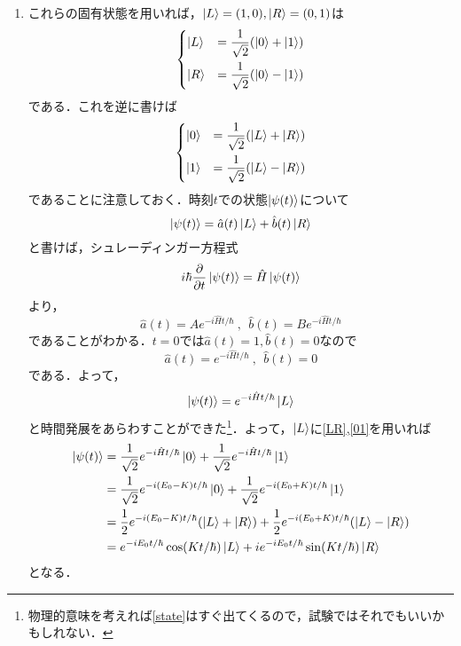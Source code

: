 \documentclass[a4paper,pdflatex,ja=standard]{bxjsarticle}
\begin{document}
\begin{enumerate}
  \item 
  これらの固有状態を用いれば，$\ket{L}=(1,0),\ket{R}=(0,1)$は
  \begin{equation}
    \begin{dcases}
      \ket{L}
      &=
      \frac{1}{\sqrt{2}}(\ket{0}+\ket{1})
      \\
      \ket{R}
      &=
      \frac{1}{\sqrt{2}}(\ket{0}-\ket{1})
    \end{dcases}
    \label{LR}
  \end{equation}
  である．これを逆に書けば
  \begin{equation}
    \begin{dcases}
      \ket{0}
      &=
      \frac{1}{\sqrt{2}}(\ket{L}+\ket{R})
      \\
      \ket{1}
      &=
      \frac{1}{\sqrt{2}}(\ket{L}-\ket{R})
    \end{dcases}
    \label{01}
  \end{equation}
  であることに注意しておく．時刻$t$での状態$\ket{\psi(t)}$について
  \begin{equation}
    \ket{\psi(t)}
    =
    \hat{a}(t)\ket{L}
    +
    \hat{b}(t)\ket{R}
  \end{equation}
  と書けば，シュレーディンガー方程式
  \begin{equation}
    i\hbar\pdv{}{t}\ket{\psi(t)}
    =
    \hat{H}\ket{\psi(t)}
  \end{equation}
  より，
  \begin{equation}
    \hat{a}(t)
    =
    Ae^{-i\hat{H}t/\hbar}
    \ ,\ \ 
    \hat{b}(t)
    =
    Be^{-i\hat{H}t/\hbar}
  \end{equation}
  であることがわかる．$t=0$では$\hat{a}(t)=1,\hat{b}(t)=0$なので
  \begin{equation}
    \hat{a}(t)
    =
    e^{-i\hat{H}t/\hbar}
    \ ,\ \ 
    \hat{b}(t)
    =
    0
  \end{equation}
  である．よって，
  \begin{equation}
    \ket{\psi(t)}
    =
    e^{-i\hat{H}t/\hbar}\ket{L}
    \label{state}
  \end{equation}
  と時間発展をあらわすことができた\footnote{物理的意味を考えれば\eqref{state}はすぐ出てくるので，試験ではそれでもいいかもしれない．}．よって，$\ket{L}$に\eqref{LR},\eqref{01}を用いれば
  \begin{align}
    \ket{\psi(t)}
    &=
    \frac{1}{\sqrt{2}}e^{-i\hat{H}t/\hbar}\ket{0}
    +
    \frac{1}{\sqrt{2}}e^{-i\hat{H}t/\hbar}\ket{1}
    \nonumber
    \\
    &=
    \frac{1}{\sqrt{2}}e^{-i(E_{0}-K)t/\hbar}\ket{0}
    +
    \frac{1}{\sqrt{2}}e^{-i(E_{0}+K)t/\hbar}\ket{1}
    \nonumber
    \\
    &=
    \frac{1}{2}e^{-i(E_{0}-K)t/\hbar}(\ket{L}+\ket{R})
    +
    \frac{1}{2}e^{-i(E_{0}+K)t/\hbar}(\ket{L}-\ket{R})
    \nonumber
    \\
    &=
    e^{-iE_{0}t/\hbar}\cos(Kt/\hbar)\ket{L}
    +
    ie^{-iE_{0}t/\hbar}\sin(Kt/\hbar)\ket{R}
  \end{align}
  となる．


\end{enumerate}
\end{document}

